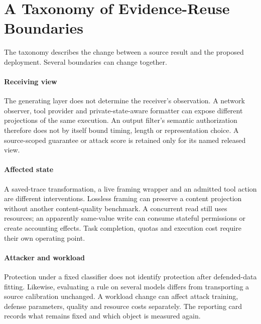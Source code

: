 \section{A Taxonomy of Evidence-Reuse Boundaries}\label{sec:corpus-map}
The taxonomy describes the change between a source result and the proposed deployment. Several boundaries can change together.


\paragraph{Receiving view}
The generating layer does not determine the receiver's observation. A network observer, tool provider and private-state-aware formatter can expose different projections of the same execution. An output filter's semantic authorization therefore does not by itself bound timing, length or representation choice. A source-scoped guarantee or attack score is retained only for its named released view.

\paragraph{Affected state}
A saved-trace transformation, a live framing wrapper and an admitted tool action are different interventions. Lossless framing can preserve a content projection without another content-quality benchmark. A concurrent read still uses resources; an apparently same-value write can consume stateful permissions or create accounting effects. Task completion, quotas and execution cost require their own operating point.

\paragraph{Attacker and workload}
Protection under a fixed classifier does not identify protection after defended-data fitting. Likewise, evaluating a rule on several models differs from transporting a source calibration unchanged. A workload change can affect attack training, defense parameters, quality and resource costs separately. The reporting card records what remains fixed and which object is measured again.

